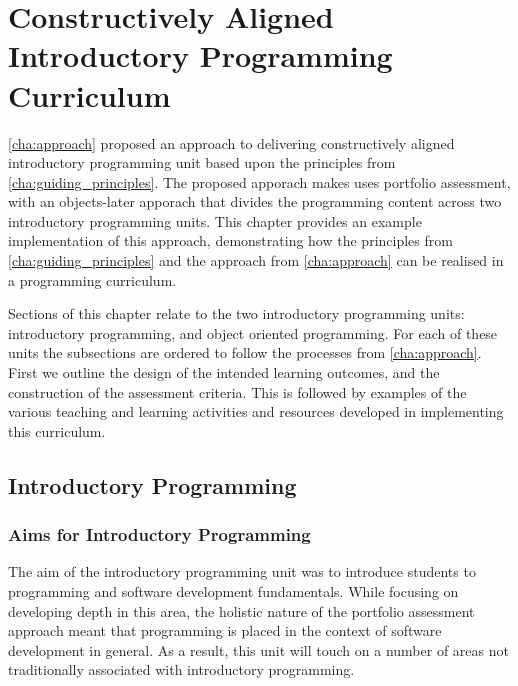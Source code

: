 
\chapter{Constructively Aligned Introductory Programming Curriculum} %
\label{cha:example_impl}

\graphicspath{{Figures/CAIntroProg/}}

\cref{cha:approach} proposed an approach to delivering constructively aligned introductory programming unit based upon the principles from \cref{cha:guiding_principles}. The proposed apporach makes uses portfolio assessment, with an objects-later apporach that divides the programming content across two introductory programming units. This chapter provides an example implementation of this approach, demonstrating how the principles from \cref{cha:guiding_principles} and the approach from \cref{cha:approach} can be realised in a programming curriculum.

Sections of this chapter relate to the two introductory programming units: introductory programming, and object oriented programming. For each of these units the subsections are ordered to follow the processes from \cref{cha:approach}. First we outline the design of the intended learning outcomes, and the construction of the assessment criteria. This is followed by examples of the various teaching and learning activities and resources developed in implementing this curriculum.  


\section{Introductory Programming} %
\label{sec:introductory_programming}

\subsection{Aims for Introductory Programming} %
\label{ssub:intro:aims}

The aim of the introductory programming unit was to introduce students to programming and software development fundamentals. While focusing on developing depth in this area, the holistic nature of the portfolio assessment approach meant that programming is placed in the context of software development in general. As a result, this unit will touch on a number of areas not traditionally associated with introductory programming.

